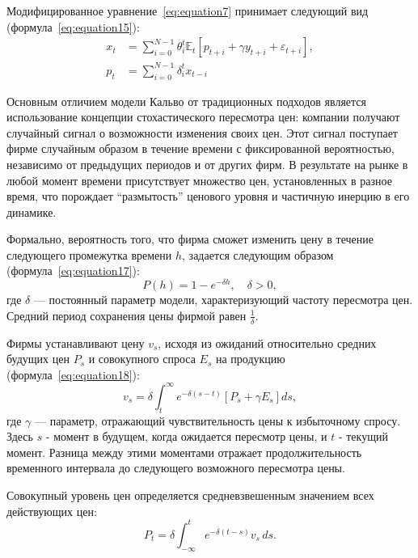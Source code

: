 Модифицированное уравнение~\eqref{eq:equation7} принимает следующий вид (формула~\eqref{eq:equation15}):
\begin{align}
	\label{eq:equation15}
	x_t &= \sum_{i=0}^{N-1} \theta_i^t \mathbb{E}_t \left[ p_{t+i} + \gamma y_{t+i} + \varepsilon_{t+i} \right], \\
	\label{eq:equation16}
	p_t &= \sum_{i=0}^{N-1} \delta_i^t x_{t-i}
\end{align}

Основным отличием модели Кальво от традиционных подходов является использование концепции стохастического пересмотра цен: компании получают случайный сигнал о возможности изменения своих цен. Этот сигнал поступает фирме случайным образом в течение времени с фиксированной вероятностью, независимо от предыдущих периодов и от других фирм. В результате на рынке в любой момент времени присутствует множество цен, установленных в разное время, что порождает \enquote{размытость} ценового уровня и частичную инерцию в его динамике.

Формально, вероятность того, что фирма сможет изменить цену в течение следующего промежутка времени \( h \), задается следующим образом (формула~\eqref{eq:equation17}):
\begin{equation}
	\label{eq:equation17}
	P(h) = 1 - e^{-\delta h}, \quad \delta > 0,
\end{equation}
где \( \delta \) — постоянный параметр модели, характеризующий частоту пересмотра цен. Средний период сохранения цены фирмой равен \( \frac{1}{\delta} \).


Фирмы устанавливают цену \( v_s \), исходя из ожиданий относительно средних будущих цен \( P_s \) и совокупного спроса \( E_s \) на продукцию (формула~\eqref{eq:equation18}):
\begin{equation}
	\label{eq:equation18}
	v_s = \delta \int_t^{\infty} e^{-\delta (s - t)} \left[ P_s + \gamma E_s \right] ds,
\end{equation}
где \( \gamma \) — параметр, отражающий чувствительность цены к избыточному спросу.
Здесь \( s \) - момент в будущем, когда ожидается пересмотр цены, и \( t \) - текущий момент. Разница между этими моментами отражает продолжительность временного интервала до следующего возможного пересмотра цены.

Совокупный уровень цен определяется средневзвешенным значением всех действующих цен:
\begin{equation}
	\label{eq:equation19}
	P_t = \delta \int_{-\infty}^{t} e^{-\delta (t - s)} v_s \, ds.
\end{equation}

